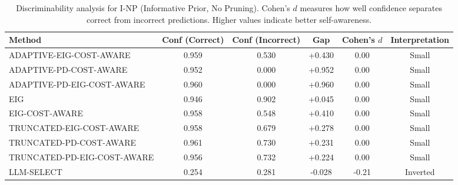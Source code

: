 \begin{table}[htbp]
\centering
\small
\caption{Discriminability analysis for I-NP (Informative Prior, No Pruning). Cohen's $d$ measures how well confidence separates correct from incorrect predictions. Higher values indicate better self-awareness.}
\label{tab:discriminability-notprune_notuniform}
\begin{tabular}{@{}lccccc@{}}
\toprule
Method & Conf (Correct) & Conf (Incorrect) & Gap & Cohen's $d$ & Interpretation \\
\midrule
ADAPTIVE-EIG-COST-AWARE & 0.959 & 0.530 & +0.430 & 0.00 & Small \\
ADAPTIVE-PD-COST-AWARE & 0.952 & 0.000 & +0.952 & 0.00 & Small \\
ADAPTIVE-PD-EIG-COST-AWARE & 0.960 & 0.000 & +0.960 & 0.00 & Small \\
EIG & 0.946 & 0.902 & +0.045 & 0.00 & Small \\
EIG-COST-AWARE & 0.958 & 0.548 & +0.410 & 0.00 & Small \\
TRUNCATED-EIG-COST-AWARE & 0.958 & 0.679 & +0.278 & 0.00 & Small \\
TRUNCATED-PD-COST-AWARE & 0.961 & 0.730 & +0.231 & 0.00 & Small \\
TRUNCATED-PD-EIG-COST-AWARE & 0.956 & 0.732 & +0.224 & 0.00 & Small \\
LLM-SELECT & 0.254 & 0.281 & -0.028 & -0.21 & Inverted \\
\bottomrule
\end{tabular}
\end{table}